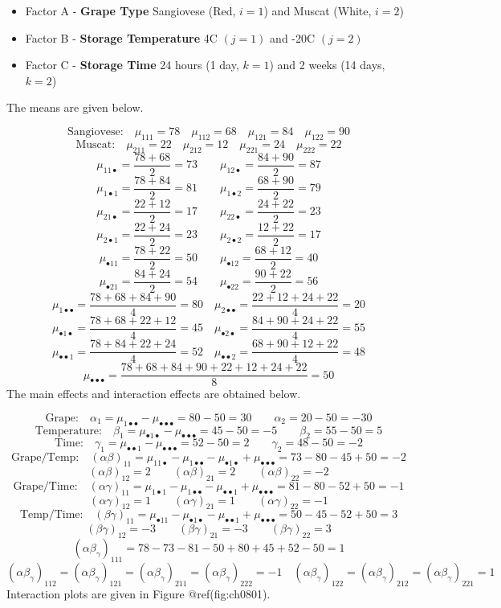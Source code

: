 \documentclass[
]{book}
\providecommand{\tightlist}{%
  \setlength{\itemsep}{0pt}\setlength{\parskip}{0pt}}
\begin{document}
\begin{itemize}
\tightlist
\item
  Factor A - \textbf{Grape Type} Sangiovese (Red, \(i=1\)) and Muscat
  (White, \(i=2\))
\item
  Factor B - \textbf{Storage Temperature} 4C \((j=1)\) and -20C
  \((j=2)\)
\item
  Factor C - \textbf{Storage Time} 24 hours (1 day, \(k=1\)) and 2 weeks
  (14 days, \(k=2\))
\end{itemize}

The means are given below.

\[
\mbox{Sangiovese:} \quad
\mu_{111}=78 \quad \mu_{112}=68 \quad \mu_{121}=84 \quad \mu_{122}=90
\] \[
\mbox{Muscat:} \quad
\mu_{211}=22 \quad \mu_{212}=12 \quad \mu_{221}=24 \quad \mu_{222}=22
\] \[
\mu_{11\bullet}=\frac{78+68}{2}=73 \qquad 
\mu_{12\bullet}=\frac{84+90}{2}=87
\] \[
\mu_{1\bullet 1}=\frac{78+84}{2}=81 \qquad
\mu_{1\bullet 2}=\frac{68+90}{2}=79
\] \[
\mu_{21\bullet}=\frac{22+12}{2}=17 \qquad 
\mu_{22\bullet}=\frac{24+22}{2}=23
\] \[
\mu_{2\bullet 1}=\frac{22+24}{2}=23 \qquad
\mu_{2\bullet 2}=\frac{12+22}{2}=17
\] \[
\mu_{\bullet 11}=\frac{78+22}{2}=50 \qquad
\mu_{\bullet 12}=\frac{68+12}{2}=40
\] \[
\mu_{\bullet 21}=\frac{84+24}{2}=54 \qquad
\mu_{\bullet 22}=\frac{90+22}{2}=56
\] \[
\mu_{1\bullet\bullet}=\frac{78+68+84+90}{4}=80 \quad
\mu_{2\bullet\bullet}=\frac{22+12+24+22}{4}=20
\] \[
\mu_{\bullet 1\bullet}=\frac{78+68+22+12}{4}=45 \quad
\mu_{\bullet 2\bullet}=\frac{84+90+24+22}{4}=55
\] \[
\mu_{\bullet\bullet 1}=\frac{78+84+22+24}{4}=52 \quad
\mu_{\bullet\bullet 2}=\frac{68+90+12+22}{4}=48
\] \[
\mu_{\bullet\bullet\bullet} =
\frac{78+68+84+90+22+12+24+22}{8}=50
\] The main effects and interaction effects are obtained below.

\[
\mbox{Grape:} \quad \alpha_1=\mu_{1\bullet\bullet}-
\mu_{\bullet\bullet\bullet} = 80-50=30
\qquad
\alpha_2=20-50=-30
\] \[
\mbox{Temperature:} \quad
\beta_1=\mu_{\bullet 1\bullet}-
\mu_{\bullet\bullet\bullet} = 45-50=-5 \qquad
\beta_2=55-50=5
\] \[
\mbox{Time:} \quad
\gamma_1=\mu_{\bullet\bullet1}-
\mu_{\bullet\bullet\bullet} = 52-50=2 \qquad
\gamma_2=48-50=-2
\] \[
\mbox{Grape/Temp:} \quad
(\alpha\beta)_{11}=
\mu_{11\bullet}-\mu_{1\bullet\bullet}-\mu_{\bullet 1 \bullet} +
\mu_{\bullet\bullet\bullet} = 73-80-45+50=-2
\] \[
(\alpha\beta)_{12}=2 \qquad
(\alpha\beta)_{21}=2 \qquad
(\alpha\beta)_{22}=-2
\] \[
\mbox{Grape/Time:} \quad
(\alpha\gamma)_{11}=
\mu_{1\bullet 1}-\mu_{1\bullet\bullet}-\mu_{\bullet\bullet 1} +
\mu_{\bullet\bullet\bullet} = 81-80-52+50=-1
\] \[
(\alpha\gamma)_{12}=1 \qquad
(\alpha\gamma)_{21}=1 \qquad
(\alpha\gamma)_{22}=-1
\] \[
\mbox{Temp/Time:} \quad
(\beta\gamma)_{11}=
\mu_{\bullet  11}-\mu_{\bullet 1\bullet}-\mu_{\bullet\bullet 1} +
\mu_{\bullet\bullet\bullet} = 50-45-52+50=3
\] \[
(\beta\gamma)_{12}=-3 \qquad
(\beta\gamma)_{21}=-3 \qquad
(\beta\gamma)_{22}=3
\] \[
(\alpha\beta_\gamma)_{111}=78-73-81-50+80+45+52-50=1
\] \[
(\alpha\beta_\gamma)_{112}=(\alpha\beta_\gamma)_{121}=
(\alpha\beta_\gamma)_{211}=(\alpha\beta_\gamma)_{222}=-1
\quad
(\alpha\beta_\gamma)_{122}=(\alpha\beta_\gamma)_{212}=
(\alpha\beta_\gamma)_{221}=1
\] Interaction plots are given in Figure @ref(fig:ch0801).
\end{document}

